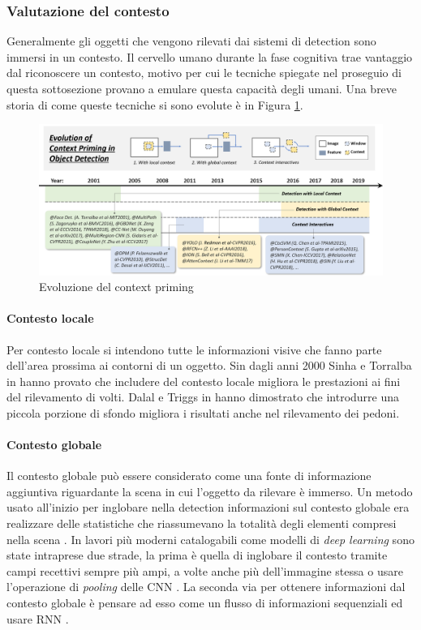 \subsubsection{Valutazione del contesto}
Generalmente gli oggetti che vengono rilevati dai sistemi di detection sono immersi in un contesto. Il cervello umano durante la fase cognitiva trae vantaggio dal riconoscere un contesto, motivo per cui le tecniche spiegate nel proseguio di questa sottosezione provano a emulare questa capacità degli umani. Una breve storia di come queste tecniche si sono evolute è in Figura \ref{fig:context_history}.
\begin{figure}
    \centering
    \includegraphics[width=\textwidth]{images/evol-context.png}
    \caption{Evoluzione del context priming \cite{DBLP:journals/corr/abs-1905-05055}}
    \label{fig:context_history}
\end{figure}
\paragraph{Contesto locale}
Per contesto locale si intendono tutte le informazioni visive che fanno parte dell'area prossima ai contorni di un oggetto. Sin dagli anni 2000 Sinha e Torralba in \cite{torralba2001detecting} hanno provato che includere del contesto locale migliora le prestazioni ai fini del rilevamento di volti. Dalal e Triggs in \cite{dalal2005histograms} hanno dimostrato che introdurre una piccola porzione di sfondo migliora i risultati anche nel rilevamento dei pedoni. 
\paragraph{Contesto globale}
Il contesto globale può essere considerato come una fonte di informazione aggiuntiva riguardante la scena in cui l'oggetto da rilevare è immerso. Un metodo usato all'inizio per inglobare nella detection informazioni sul contesto globale era realizzare delle statistiche che riassumevano la totalità degli elementi compresi nella scena \cite{divvala2009empirical}. In lavori più moderni catalogabili come modelli di \textit{deep learning} sono state intraprese due strade, la prima è quella di inglobare il contesto tramite campi recettivi sempre più ampi, a volte anche più dell'immagine stessa \cite{redmon2016you} o  usare l'operazione di \textit{pooling} delle \ac{CNN} \cite{li2018r}. La seconda via per ottenere informazioni dal contesto globale è pensare ad esso come un flusso di informazioni sequenziali ed usare \ac{RNN} \cite{bell2016inside, li2016attentive}. 
